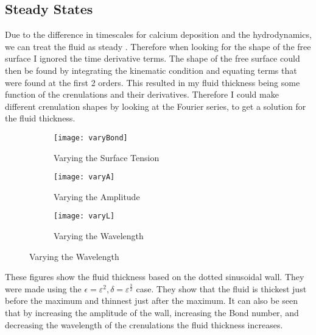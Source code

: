 \documentclass[12pt]{article}
\begin{document}
 \subsection{Steady States}
 Due to the difference in timescales for calcium deposition and the hydrodynamics, we can treat the fluid as steady \cite{short,PhysRevLett.108.238501}. Therefore when looking for the shape of the free surface I ignored the time derivative terms. The shape of the free surface could then be found by integrating the kinematic condition and equating terms that were found at the first 2 orders. This resulted in my fluid thickness being some function of the crenulations and their derivatives. Therefore I could make different crenulation shapes by looking at the Fourier series, to get a solution for the fluid thickness.

\begin{figure}[H]
	\caption{Example fluid thicknesses with a sinusoidal wall}	\begin{subfigure}{.33\linewidth}
	\centering
	\caption{Varying  the Surface Tension}
	\texttt{[image: varyBond]}
\end{subfigure}	\begin{subfigure}{.33\linewidth}
	\centering
	\caption{Varying the Amplitude}
	\texttt{[image: varyA]}
\end{subfigure}\begin{subfigure}{.33\linewidth}
	\centering
	\caption{Varying the Wavelength}
	\texttt{[image: varyL]}
\end{subfigure}\end{figure}
These figures show the fluid thickness based on the dotted sinusoidal wall. They were made using the  $\epsilon= \varepsilon^2, \delta = \varepsilon^{\frac{3}{2}}$  case. They show that the fluid is thickest just before the maximum and thinnest just after the maximum. It can also be seen that by increasing the amplitude of the wall, increasing the Bond number, and decreasing the wavelength of the crenulations the fluid thickness increases.
\end{document}
